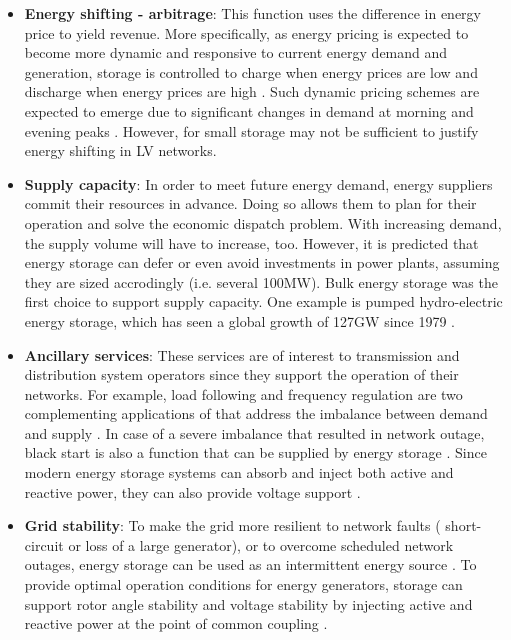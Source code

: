 \begin{itemize}
\item
\textbf{Energy shifting - arbitrage}: This function uses the difference in energy price to yield revenue.
More specifically, as energy pricing is expected to become more dynamic and responsive to current energy demand and generation, storage is controlled to charge when energy prices are low and discharge when energy prices are high \cite{Chen2009, Leou2012}.
Such dynamic pricing schemes are expected to emerge due to significant changes in demand at morning and evening peaks \cite{Koohi-Kamali2013}.
However, for small storage may not be sufficient to justify energy shifting in LV networks.
\item
\textbf{Supply capacity}: In order to meet future energy demand, energy suppliers commit their resources in advance.
Doing so allows them to plan for their operation and solve the economic dispatch problem.
With increasing demand, the supply volume will have to increase, too.
However, it is predicted that energy storage can defer or even avoid investments in power plants, assuming they are sized accrodingly (i.e. several 100MW)\cite{Dobie1998}.
Bulk energy storage was the first choice to support supply capacity.
One example is pumped hydro-electric energy storage, which has seen a global growth of 127GW since 1979 \cite{Rehman2015, Barbour2015, Barbour2016}.
\item
\textbf{Ancillary services}: These services are of interest to transmission and distribution system operators since they support the operation of their networks.
For example, load following and frequency regulation are two complementing applications of that address the imbalance between demand and supply \cite{Bevrani2011}.
In case of a severe imbalance that resulted in network outage, black start is also a function that can be supplied by energy storage \cite{Cole1995, Kashem2007}.
Since modern energy storage systems can absorb and inject both active and reactive power, they can also provide voltage support \cite{Kulkarni2005}.
\item
\textbf{Grid stability}: To make the grid more resilient to network faults ( short-circuit or loss of a large generator), or to overcome scheduled network outages, energy storage can be used as an intermittent energy source \cite{Kundur1993}.
To provide optimal operation conditions for energy generators, storage can support rotor angle stability and voltage stability by injecting active and reactive power at the point of common coupling \cite{Chakraborty2012, Kolluri2002}.

\end{itemize}
